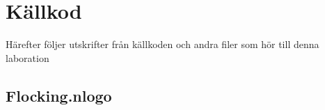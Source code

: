 \documentclass[titlepage, a4paper, 12pt]{article}
\begin{document}
    




\newpage
\appendix
{}
\section{Källkod}\label{sec:kallkod}
Härefter följer utskrifter från källkoden och andra filer som hör till
denna laboration

\subsection{Flocking.nlogo}\label{app:Flocking.nlogo}
\begin{footnotesize}
  
\end{footnotesize}
\end{document}
